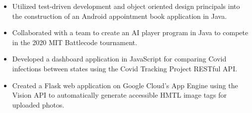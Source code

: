 \documentclass[11pt]{article}
\begin{document}
\begin{itemize}[leftmargin=*, itemsep=0pt, topsep=5pt]
	\item Utilized test-driven development and object oriented design principals into the construction of an Android appointment book application in Java.
	\item Collaborated with a team to create an AI player program in Java to compete in the 2020 MIT Battlecode tournament.
	\item Developed a dashboard application in JavaScript for comparing Covid infections between states using the Covid Tracking Project RESTful API.
	\item Created a Flask web application on Google Cloud’s App Engine using the Vision API to automatically generate accessible HMTL image tags for uploaded photos.
\end{itemize} 
\smallskip
\end{document}
